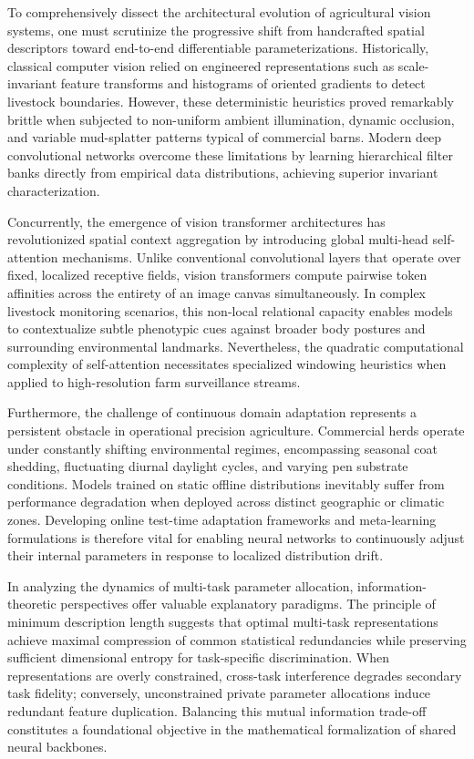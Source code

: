 \documentclass[Times,12pt,oneside,openany,print,index]{report}
\begin{document}
To comprehensively dissect the architectural evolution of agricultural vision systems, one must scrutinize the progressive shift from handcrafted spatial descriptors toward end-to-end differentiable parameterizations. Historically, classical computer vision relied on engineered representations such as scale-invariant feature transforms and histograms of oriented gradients to detect livestock boundaries. However, these deterministic heuristics proved remarkably brittle when subjected to non-uniform ambient illumination, dynamic occlusion, and variable mud-splatter patterns typical of commercial barns. Modern deep convolutional networks overcome these limitations by learning hierarchical filter banks directly from empirical data distributions, achieving superior invariant characterization.

Concurrently, the emergence of vision transformer architectures has revolutionized spatial context aggregation by introducing global multi-head self-attention mechanisms. Unlike conventional convolutional layers that operate over fixed, localized receptive fields, vision transformers compute pairwise token affinities across the entirety of an image canvas simultaneously. In complex livestock monitoring scenarios, this non-local relational capacity enables models to contextualize subtle phenotypic cues against broader body postures and surrounding environmental landmarks. Nevertheless, the quadratic computational complexity of self-attention necessitates specialized windowing heuristics when applied to high-resolution farm surveillance streams.

Furthermore, the challenge of continuous domain adaptation represents a persistent obstacle in operational precision agriculture. Commercial herds operate under constantly shifting environmental regimes, encompassing seasonal coat shedding, fluctuating diurnal daylight cycles, and varying pen substrate conditions. Models trained on static offline distributions inevitably suffer from performance degradation when deployed across distinct geographic or climatic zones. Developing online test-time adaptation frameworks and meta-learning formulations is therefore vital for enabling neural networks to continuously adjust their internal parameters in response to localized distribution drift.

In analyzing the dynamics of multi-task parameter allocation, information-theoretic perspectives offer valuable explanatory paradigms. The principle of minimum description length suggests that optimal multi-task representations achieve maximal compression of common statistical redundancies while preserving sufficient dimensional entropy for task-specific discrimination. When representations are overly constrained, cross-task interference degrades secondary task fidelity; conversely, unconstrained private parameter allocations induce redundant feature duplication. Balancing this mutual information trade-off constitutes a foundational objective in the mathematical formalization of shared neural backbones.
\end{document}
